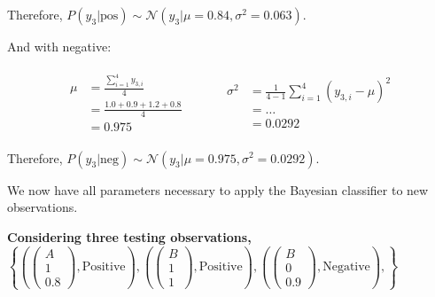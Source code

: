 \documentclass[12pt]{article}
\begin{document}
\begin{enumerate}[leftmargin=\labelsep,resume]
          Therefore, $P(y_3|\text{pos}) \sim \mathcal{N}(y_3 | \mu = 0.84, \sigma^2 = 0.063)$.

          And with negative:

          $$
              \begin{array}{c|c}
                  \begin{aligned}
                      \mu & = \frac{\sum^{4}_{i=1} y_{3,i}}{4} \\
                          & = \frac{1.0 + 0.9 + 1.2 + 0.8}{4}  \\
                          & = 0.975
                  \end{aligned}
                  \quad &
                  \quad
                  \begin{aligned}
                      \sigma^2 & = \frac{1}{4 - 1} \sum^4_{i=1} \left(y_{3,i} - \mu\right)^2 \\
                               & = \dots                                                     \\
                               & = 0.0292
                  \end{aligned}
              \end{array}
          $$

          Therefore, $P(y_3|\text{neg}) \sim \mathcal{N}(y_3 | \mu = 0.975, \sigma^2 = 0.0292)$.

          We now have all parameters necessary to apply the Bayesian classifier to new observations.

\end{enumerate}

\vspace{3em}

{\bfseries
    Considering three testing observations,
    \(
    \left\{
    \left(
    \begin{pmatrix}
        A \\
        1 \\
        0.8
    \end{pmatrix},
    \text{Positive}
    \right),
    \left(
    \begin{pmatrix}
        B \\
        1 \\
        1
    \end{pmatrix},
    \text{Positive}
    \right),
    \left(
    \begin{pmatrix}
        B \\
        0 \\
        0.9
    \end{pmatrix},
    \text{Negative}
    \right),
    \right\}
    \)
}
\end{document}
